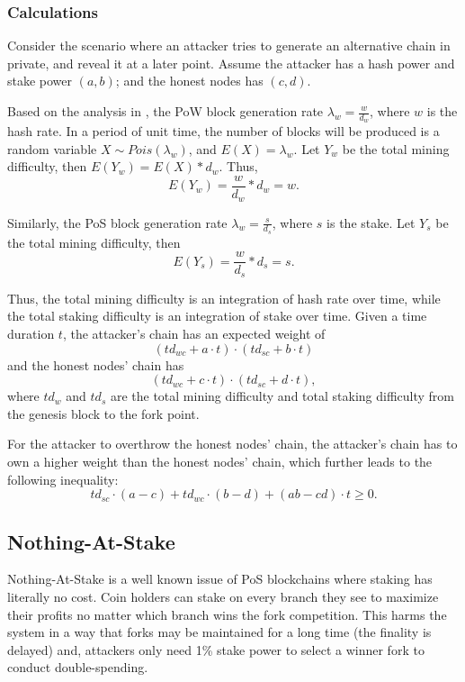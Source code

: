 \documentclass[a4paper]{article}
\begin{document}
\subsubsection{Calculations}

Consider the scenario where an attacker tries to generate an alternative chain in private, and reveal it at a later point. Assume the attacker has a hash power and stake power $(a, b)$; and the honest nodes has $(c, d)$.

Based on the analysis in \cite{bitfury2015}, the PoW block generation rate $\lambda_w = \frac{w}{d_w}$, where $w$ is the hash rate. In a period of unit time, the number of blocks will be produced is a random variable $X \sim Pois(\lambda_w)$, and $E(X) = \lambda_w$. Let $Y_w$ be the total mining difficulty, then $E(Y_w) = E(X) * d_w$. Thus,
$$
E(Y_w) = \frac{w}{d_w} * d_w = w.
$$

Similarly, the PoS block generation rate $\lambda_w = \frac{s}{d_s}$, where $s$ is the stake. Let $Y_s$ be the total mining difficulty, then
$$
E(Y_s) = \frac{w}{d_s} * d_s = s.
$$

Thus, the total mining difficulty is an integration of hash rate over time, while the total staking difficulty is an integration of stake over time. Given a time duration $t$, the attacker's chain has an expected weight of
$$
(td_{wc} + a \cdot t) \cdot (td_{sc} + b \cdot t)
$$
and the honest nodes' chain has
$$
(td_{wc} + c \cdot t) \cdot (td_{sc} + d \cdot t),
$$
where $td_w$ and $td_s$ are the total mining difficulty and total staking difficulty from the genesis block to the fork point.

For the attacker to overthrow the honest nodes' chain, the attacker's chain has to own a higher weight than the honest nodes' chain, which further leads to the following inequality:
\begin{equation}
\label{eq}
    td_{sc} \cdot (a - c) + td_{wc} \cdot (b - d) + (ab - cd) \cdot t \geq 0.
\end{equation}

\subsection{Nothing-At-Stake}
\label{sec:nothing_at_stake}

Nothing-At-Stake is a well known issue of PoS blockchains where staking has literally no cost. Coin holders can stake on every branch they see to maximize their profits no matter which branch wins the fork competition. This harms the system in a way that forks may be maintained for a long time (the finality is delayed) and, attackers only need 1\% stake power to select a winner fork to conduct double-spending.
\end{document}
